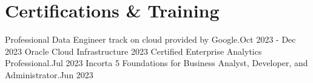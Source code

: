 \section{Certifications \& Training}

\begin{itemize}
           {Professional Data Engineer track on cloud provided by Google.}{Oct 2023 - Dec 2023}
           {Oracle Cloud Infrastructure 2023 Certified Enterprise Analytics Professional.}{Jul 2023}
           {Incorta 5 Foundations for Business Analyst, Developer, and Administrator.}{Jun 2023}
  
\end{itemize}
